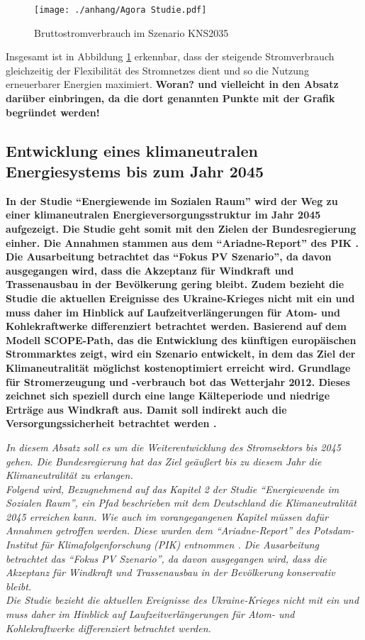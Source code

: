 		\begin{figure} [H]
			\centering
			\label{Abb. Zunahme Flexibilität} 
			\texttt{[image: ./anhang/Agora Studie.pdf]}
			\caption{Bruttostromverbrauch im Szenario KNS2035 \cite[S.33]{Agora_KlimaneutralesStromsystem}}
		\end{figure}
			
		Insgesamt ist in Abbildung \ref{Abb. Zunahme Flexibilität} erkennbar, dass der steigende Stromverbrauch gleichzeitig der Flexibilität des Stromnetzes dient und so die Nutzung erneuerbarer Energien maximiert. \textbf{Woran? und vielleicht in den Absatz darüber einbringen, da die dort genannten Punkte mit der Grafik begründet werden!} \\
	
	\subsection{Entwicklung eines klimaneutralen Energiesystems bis zum Jahr 2045}
	
		\textbf{In der Studie "`Energiewende im Sozialen Raum"' wird der Weg zu einer klimaneutralen Energieversorgungsstruktur im Jahr 2045 aufgezeigt.
		Die Studie geht somit mit den Zielen der Bundesregierung einher.
		Die Annahmen stammen aus dem "`Ariadne-Report"' des PIK \cite[S.150]{AriadneReport}.
		Die Ausarbeitung betrachtet das "`Fokus PV Szenario"', da davon ausgegangen wird, dass die Akzeptanz für Windkraft und Trassenausbau in der Bevölkerung gering bleibt.
		Zudem bezieht die Studie die aktuellen Ereignisse des Ukraine-Krieges nicht mit ein und muss daher im Hinblick auf Laufzeitverlängerungen für Atom- und Kohlekraftwerke differenziert betrachtet werden.
		Basierend auf dem Modell SCOPE-Path, das die Entwicklung des künftigen europäischen Strommarktes zeigt, wird ein Szenario entwickelt, in dem das Ziel der Klimaneutralität möglichst kostenoptimiert erreicht wird.
		Grundlage für Stromerzeugung und -verbrauch bot das Wetterjahr 2012. Dieses zeichnet sich speziell durch eine lange Kälteperiode und niedrige Erträge aus Windkraft aus. Damit soll indirekt auch die Versorgungssicherheit betrachtet werden \cite[S.2]{ESRa_Fraunhofer}.}
		
		\textsl{In diesem Absatz soll es um die Weiterentwicklung des Stromsektors bis 2045 gehen. Die Bundesregierung hat das Ziel geäußert bis zu diesem Jahr die Klimaneutralität zu erlangen.\\
		Folgend wird, Bezugnehmend auf das Kapitel 2 der Studie "`Energiewende im Sozialen Raum"', ein Pfad beschrieben mit dem Deutschland die Klimaneutralität 2045 erreichen kann. Wie auch im vorangegangenen Kapitel müssen dafür Annahmen getroffen werden. Diese wurden dem "`Ariadne-Report"' des Potsdam-Institut für Klimafolgenforschung (PIK) entnommen \cite[S.150]{AriadneReport}. Die Ausarbeitung betrachtet das "`Fokus PV Szenario"', da davon ausgegangen wird, dass die Akzeptanz für Windkraft und Trassenausbau in der Bevölkerung konservativ bleibt.\\
		Die Studie bezieht die aktuellen Ereignisse des Ukraine-Krieges nicht mit ein und muss daher im Hinblick auf Laufzeitverlängerungen für Atom- und Kohlekraftwerke differenziert betrachtet werden.}\\
		
